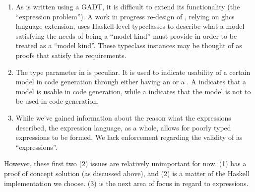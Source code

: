 \begin{enumerate}

	\item As \ModelKinds{} is written using a GADT, it is difficult to extend
	      its functionality (the ``expression problem''). A work in progress re-design of
	      \ModelKinds{}, relying on \acs{ghc}s \ConstraintKinds{} language extension, uses
	      Haskell-level typeclasses to describe what a model satisfying the
	      needs of being a ``model kind'' must provide in order to be treated as
	      a ``model kind''. These typeclass instances may be thought of as
	      proofs that satisfy the requirements.

	\item The type parameter in \ModelKinds{} is peculiar. It is used to
	      indicate usability of a certain model in code generation through
	      either having an \Expr{} or a \ModelExpr{}. A  indicates that a model is usable in code generation, while a
	       indicates that the model is not to be
	      used in code generation.

	\item While we've gained information about the reason what the expressions
	      described, the expression language, as a whole, allows for poorly
	      typed expressions to be formed. We lack enforcement regarding the
	      validity of \Expr{} as ``expressions''.

\end{enumerate}

However, these first two (2) issues are relatively unimportant for now. (1) has
a proof of concept solution (as discussed above), and (2) is a matter of the
Haskell implementation we choose. (3) is the next area of focus in regard to
expressions.
